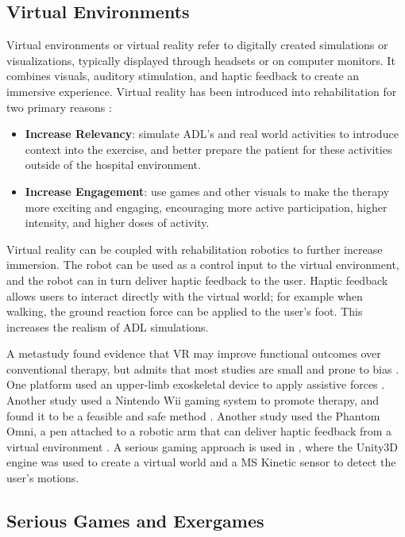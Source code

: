 \documentclass[12pt]{report}
\begin{document}
	\subsection{Virtual Environments} \label{Sec:VR}
	
	Virtual environments or virtual reality refer to digitally created simulations or visualizations, typically displayed through headsets or on computer monitors. It combines visuals, auditory stimulation, and haptic feedback to create an immersive experience. Virtual reality has been introduced into rehabilitation for two primary reasons \cite{Laver2015}:
	\begin{itemize}
		\item \textbf{Increase Relevancy}: simulate ADL's and real world activities to introduce context into the exercise, and better prepare the patient for these activities outside of the hospital environment. 
		\item \textbf{Increase Engagement}: use games and other visuals to make the therapy more exciting and engaging, encouraging more active participation, higher intensity, and higher doses of activity. 
	\end{itemize}

	Virtual reality can be coupled with rehabilitation robotics to further increase immersion. The robot can be used as a control input to the virtual environment, and the robot can in turn deliver haptic feedback to the user. Haptic feedback allows users to interact directly with the virtual world; for example when walking, the ground reaction force can be applied to the user's foot. This increases the realism of ADL simulations. 
	
	A metastudy found evidence that VR may improve functional outcomes over conventional therapy, but admits that most studies are small and prone to bias \cite{Laver2015}. One platform used an upper-limb exoskeletal device to apply assistive forces  \cite{Patel2015}. Another study used a Nintendo Wii gaming system to promote therapy, and found it to be a feasible and safe method  \cite{Saposnik2010}. Another study used the Phantom Omni, a pen attached to a robotic arm that can deliver haptic feedback from a virtual environment \cite{Jiang2017}. A serious gaming approach is used in \cite{SociedadeBrasileiradeInformaticaemSaude2014}, where the Unity3D engine was used to create a virtual world and a MS Kinetic sensor to detect the user's motions. 
	
\subsection{Serious Games and Exergames}
\end{document}
